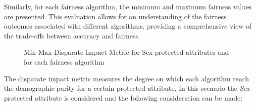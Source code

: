Similarly, for each fairness algorithm, the minimum and maximum fairness values are presented. This evaluation allows for an understanding of the fairness outcomes associated with different algorithms, providing a comprehensive view of the trade-offs between accuracy and fairness.
\begin{figure}[H]
    \centering
    \caption{Min-Max Disparate Impact Metric for Sex protected attributes and for each fairness algorithm}
\end{figure}

The disparate impact metric measures the degree on which each algorithm reach the demographic parity for a certain protected attribute. In this scenario the \emph{Sex} protected attribute is considered and the following consideration can be made:

